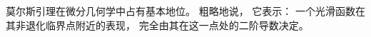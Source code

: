 
\begin{issues}
\issueTODO
\issueDraft
\end{issues}


莫尔斯引理在微分几何学中占有基本地位。 粗略地说， 它表示： 一个光滑函数在其非退化临界点附近的表现， 完全由其在这一点处的二阶导数决定。 